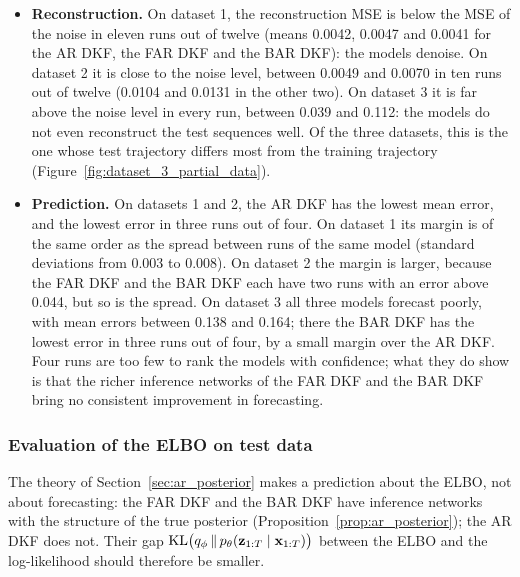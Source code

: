 \begin{itemize}
    \item \textbf{Reconstruction.} On dataset 1, the reconstruction MSE
    is below the MSE of the noise in eleven runs out of twelve (means
    0.0042, 0.0047 and 0.0041 for the AR DKF, the FAR DKF and the BAR
    DKF): the models denoise. On dataset 2 it is close to the noise level,
    between 0.0049 and 0.0070 in ten runs out of twelve (0.0104 and
    0.0131 in the other two). On dataset 3 it is far above the noise
    level in every run, between 0.039 and 0.112: the models do not even
    reconstruct the test sequences well. Of the three datasets, this is
    the one whose test trajectory differs most from the training
    trajectory (Figure~\ref{fig:dataset_3_partial_data}).
    \item \textbf{Prediction.} On datasets 1 and 2, the AR DKF has the
    lowest mean error, and the lowest error in three runs out of four.
    On dataset 1 its margin is of the same order as the spread between
    runs of the same model (standard deviations from 0.003 to 0.008). On
    dataset 2 the margin is larger, because the FAR DKF and the BAR DKF
    each have two runs with an error above 0.044, but so is the spread.
    On dataset 3 all three models forecast poorly, with mean errors
    between 0.138 and 0.164; there the BAR DKF has the lowest error in
    three runs out of four, by a small margin over the AR DKF. Four runs
    are too few to rank the models with confidence; what they do show is
    that the richer inference networks of the FAR DKF and the BAR DKF
    bring no consistent improvement in forecasting.
\end{itemize}

\subsubsection*{Evaluation of the ELBO on test data}

The theory of Section~\ref{sec:ar_posterior} makes a prediction about
the ELBO, not about forecasting: the FAR DKF and the BAR DKF have
inference networks with the structure of the true posterior
(Proposition~\ref{prop:ar_posterior}); the AR DKF does not. Their gap
$\mathrm{KL}\big(q_\phi \,\|\, p_\theta(\mathbf{z}_{1:T} \mid \mathbf{x}_{1:T})\big)$
between the ELBO and the log-likelihood should therefore be smaller.


